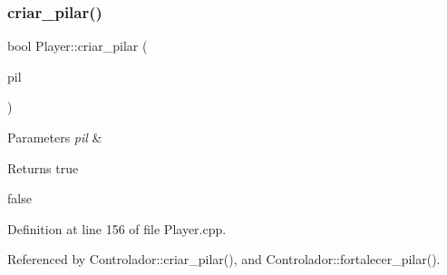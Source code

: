 \mbox{\label{class_player_a23fda6bb2c90d8033dc6ae07d1f27964}} 
\subsubsection{\texorpdfstring{criar\+\_\+pilar()}{criar\_pilar()}}
{\footnotesize\ttfamily bool Player\+::criar\+\_\+pilar (\begin{DoxyParamCaption}\item[{Tipo\+Pilar}]{pil }\end{DoxyParamCaption})}


\begin{DoxyParams}{Parameters}
{\em pil} & \\
\hline
\end{DoxyParams}
\begin{DoxyReturn}{Returns}
true 

false 
\end{DoxyReturn}


Definition at line 156 of file Player.\+cpp.



Referenced by Controlador\+::criar\+\_\+pilar(), and Controlador\+::fortalecer\+\_\+pilar().


